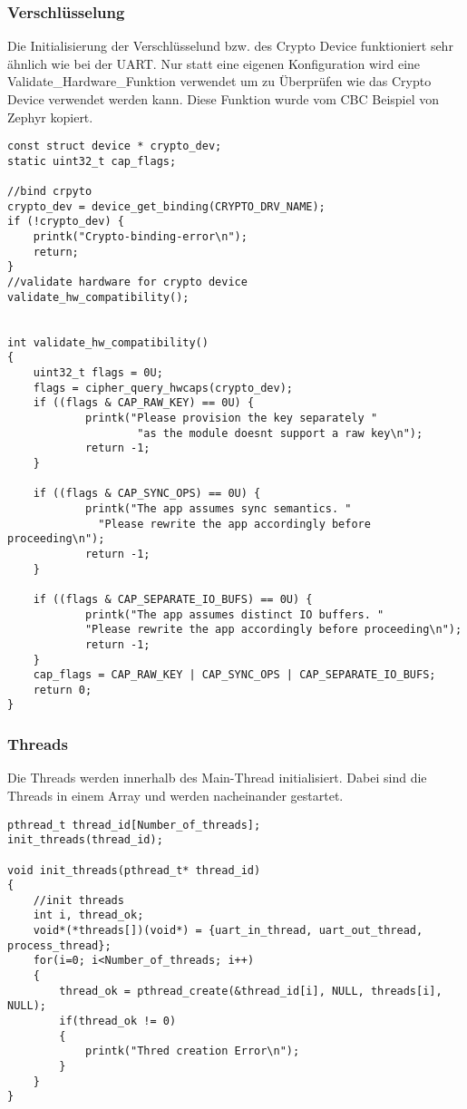 \newpage
    \subsubsection{Verschlüsselung}
        Die Initialisierung der Verschlüsselund bzw. des Crypto Device funktioniert sehr ähnlich wie bei der UART. Nur statt eine eigenen Konfiguration wird eine 
        Validate\_Hardware\_Funktion verwendet um zu Überprüfen wie das Crypto Device verwendet werden kann. Diese Funktion wurde vom CBC Beispiel von Zephyr kopiert. 
        \begin{lstlisting}[style=StyleC, captionpos=b, caption=UART-Initialisierung, label=UART-Initialisierung]
const struct device * crypto_dev;
static uint32_t cap_flags;

//bind crpyto
crypto_dev = device_get_binding(CRYPTO_DRV_NAME);
if (!crypto_dev) {
    printk("Crypto-binding-error\n");
    return;
}
//validate hardware for crypto device
validate_hw_compatibility();


int validate_hw_compatibility()
{
	uint32_t flags = 0U;
	flags = cipher_query_hwcaps(crypto_dev);
    if ((flags & CAP_RAW_KEY) == 0U) {
            printk("Please provision the key separately "
                    "as the module doesnt support a raw key\n");
            return -1;
    }

    if ((flags & CAP_SYNC_OPS) == 0U) {
            printk("The app assumes sync semantics. "
              "Please rewrite the app accordingly before proceeding\n");
            return -1;
    }

    if ((flags & CAP_SEPARATE_IO_BUFS) == 0U) {
            printk("The app assumes distinct IO buffers. "
            "Please rewrite the app accordingly before proceeding\n");
            return -1;
    }
	cap_flags = CAP_RAW_KEY | CAP_SYNC_OPS | CAP_SEPARATE_IO_BUFS;
	return 0;
}
        \end{lstlisting}


\newpage
    \subsubsection{Threads}
        Die Threads werden innerhalb des Main-Thread initialisiert. Dabei sind die Threads in einem Array und werden nacheinander gestartet. 
        \begin{lstlisting}[style=StyleC, captionpos=b, caption=UART-Initialisierung, label=UART-Initialisierung]
pthread_t thread_id[Number_of_threads];
init_threads(thread_id);
        
void init_threads(pthread_t* thread_id)
{	
	//init threads
	int i, thread_ok;
	void*(*threads[])(void*) = {uart_in_thread, uart_out_thread, process_thread};
	for(i=0; i<Number_of_threads; i++)
	{
		thread_ok = pthread_create(&thread_id[i], NULL, threads[i], NULL);
		if(thread_ok != 0)
		{
			printk("Thred creation Error\n");
		}
	}
}
        \end{lstlisting}


